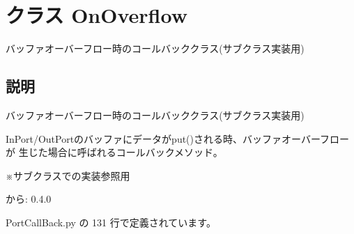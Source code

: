 \section{クラス OnOverflow}
\label{classsource__py_1_1_port_call_back_1_1_on_overflow}
バッファオーバーフロー時のコールバッククラス(サブクラス実装用)  




\subsection{説明}
バッファオーバーフロー時のコールバッククラス(サブクラス実装用) 

InPort/OutPortのバッファにデータがput()される時、バッファオーバーフローが 生じた場合に呼ばれるコールバックメソッド。\par
 ※サブクラスでの実装参照用

\begin{Desc}
\item[から:]0.4.0 \end{Desc}


 PortCallBack.py の 131 行で定義されています。